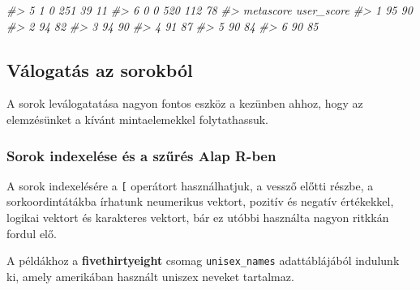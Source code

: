\documentclass[
]{book}
\newenvironment{Shaded}{\begin{snugshade}}{\end{snugshade}}
\newcommand{\CommentTok}[1]{\textcolor[rgb]{0.56,0.35,0.01}{\textit{#1}}}
\begin{document}
\begin{Shaded}
\begin{Highlighting}[]
\CommentTok{\#\textgreater{} 5               1                0            251            39             11}
\CommentTok{\#\textgreater{} 6               0                0            520           112             78}
\CommentTok{\#\textgreater{}   metascore user\_score}
\CommentTok{\#\textgreater{} 1        95         90}
\CommentTok{\#\textgreater{} 2        94         82}
\CommentTok{\#\textgreater{} 3        94         90}
\CommentTok{\#\textgreater{} 4        91         87}
\CommentTok{\#\textgreater{} 5        90         84}
\CommentTok{\#\textgreater{} 6        90         85}
\end{Highlighting}
\end{Shaded}

\hypertarget{vuxe1logatuxe1s-az-sorokbuxf3l}{%
\subsection{Válogatás az sorokból}\label{vuxe1logatuxe1s-az-sorokbuxf3l}}

A sorok leválogatatása nagyon fontos eszköz a kezünben ahhoz, hogy az elemzésünket a kívánt mintaelemekkel folytathassuk.

\hypertarget{sorok-indexeluxe9se-uxe9s-a-szux171ruxe9s-alap-r-ben}{%
\subsubsection{Sorok indexelése és a szűrés Alap R-ben}\label{sorok-indexeluxe9se-uxe9s-a-szux171ruxe9s-alap-r-ben}}

A sorok indexelésére a \texttt{{[}} operátort használhatjuk, a vessző előtti részbe, a sorkoordintátákba írhatunk neumerikus vektort, pozitív és negatív értékekkel, logikai vektort és karakteres vektort, bár ez utóbbi használta nagyon ritkkán fordul elő.

A példákhoz a \textbf{fivethirtyeight} csomag \texttt{unisex\_names} adattáblájából indulunk ki, amely amerikában használt uniszex neveket tartalmaz.
\end{document}
